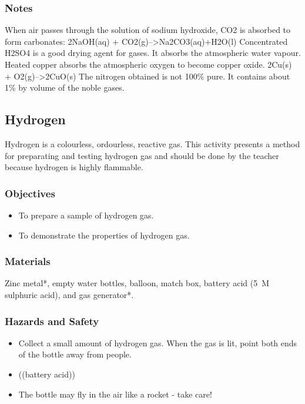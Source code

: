 \subsubsection*{Notes}
When air passes through the solution of sodium hydroxide, CO2 is absorbed to form carbonates:
2NaOH(aq) + CO2(g)-->Na2CO3(aq)+H2O(l)
Concentrated H2SO4 is a good drying agent for gases. It absorbs the atmospheric water vapour.
Heated copper absorbs the atmospheric oxygen to become copper oxide.
2Cu(s) + O2(g)-->2CuO(s)
The nitrogen obtained is not 100\% pure. It contains about 1\% by volume of the noble gases.

\subsection{Hydrogen}

Hydrogen is a colourless, ordourless, reactive gas. This activity presents a method for preparating and testing hydrogen gas and should be done by the teacher because hydrogen is highly flammable.

\subsubsection*{Objectives}
\begin{itemize}
\item{To prepare a sample of hydrogen gas.}
\item{To demonstrate the properties of hydrogen gas.}
\end{itemize}

\subsubsection*{Materials}
Zinc metal*, empty water bottles, balloon, match box, battery acid (5~M sulphuric acid), and gas generator*.

\subsubsection*{Hazards and Safety}
\begin{itemize}
\item{Collect a small amount of hydrogen gas. When the gas is lit, point both ends of the bottle away from people.}
\item{ ((battery acid))}
\item{The bottle may fly in the air like a rocket - take care!}
\end{itemize}

